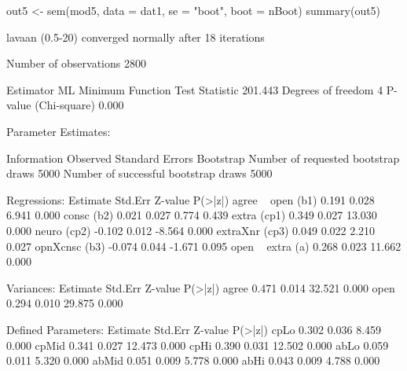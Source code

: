 \begin{Schunk}
\begin{Sinput}
 out5 <- sem(mod5, data = dat1, se = "boot", boot = nBoot)
 summary(out5)
\end{Sinput}
\begin{Soutput}
lavaan (0.5-20) converged normally after  18 iterations

  Number of observations                          2800

  Estimator                                         ML
  Minimum Function Test Statistic              201.443
  Degrees of freedom                                 4
  P-value (Chi-square)                           0.000

Parameter Estimates:

  Information                                 Observed
  Standard Errors                            Bootstrap
  Number of requested bootstrap draws             5000
  Number of successful bootstrap draws            5000

Regressions:
                   Estimate  Std.Err  Z-value  P(>|z|)
  agree ~                                             
    open      (b1)    0.191    0.028    6.941    0.000
    consc     (b2)    0.021    0.027    0.774    0.439
    extra    (cp1)    0.349    0.027   13.030    0.000
    neuro    (cp2)   -0.102    0.012   -8.564    0.000
    extraXnr (cp3)    0.049    0.022    2.210    0.027
    opnXcnsc  (b3)   -0.074    0.044   -1.671    0.095
  open ~                                              
    extra      (a)    0.268    0.023   11.662    0.000

Variances:
                   Estimate  Std.Err  Z-value  P(>|z|)
    agree             0.471    0.014   32.521    0.000
    open              0.294    0.010   29.875    0.000

Defined Parameters:
                   Estimate  Std.Err  Z-value  P(>|z|)
    cpLo              0.302    0.036    8.459    0.000
    cpMid             0.341    0.027   12.473    0.000
    cpHi              0.390    0.031   12.502    0.000
    abLo              0.059    0.011    5.320    0.000
    abMid             0.051    0.009    5.778    0.000
    abHi              0.043    0.009    4.788    0.000
\end{Soutput}
\end{Schunk}
